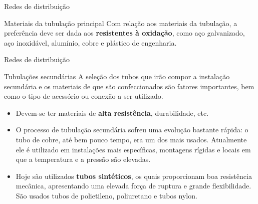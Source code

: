 \begin{frame}{Redes de distribuição}
	\begin{block}{Materiais da tubulação principal}
		Com relação aos materiais da tubulação, a preferência deve ser dada aos \textbf{resistentes à oxidação}, como aço galvanizado, aço inoxidável, alumínio, cobre e plástico de engenharia.
	\end{block}
\end{frame}


\begin{frame}{Redes de distribuição}
	\begin{block}{Tubulações secundárias}
		A seleção dos tubos que irão compor a instalação secundária e os materiais de que são confeccionados são fatores importantes, bem como o tipo de acessório ou conexão a ser utilizado.
		
		\begin{itemize}
			\item Devem-se ter materiais de \textbf{alta resistência}, durabilidade, etc.
			
			\item O processo de tubulação secundária sofreu uma evolução bastante rápida: o tubo de cobre, até bem pouco tempo, era um dos mais usados. Atualmente ele é utilizado em instalações mais específicas, montagens rígidas e locais em que a temperatura e a pressão são elevadas.
			
			\item Hoje são utilizados \textbf{tubos sintéticos}, os quais proporcionam boa resistência mecânica, apresentando uma elevada força de ruptura e grande flexibilidade. São usados tubos de polietileno, poliuretano e tubos nylon.
		\end{itemize}
	\end{block}
\end{frame}


